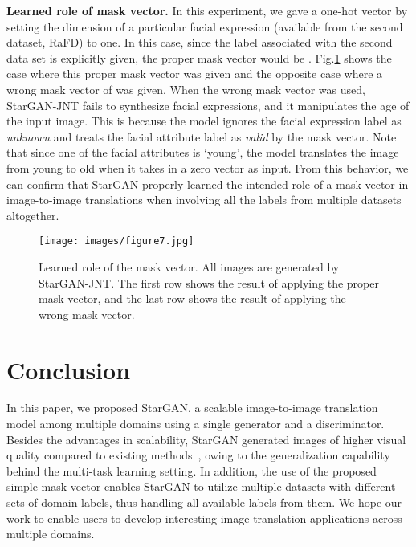 \documentclass[10pt,twocolumn,letterpaper]{article}
\begin{document}
\smallskip

\noindent\textbf{Learned role of mask vector.} In this experiment, we gave a one-hot vector  by setting the dimension of a particular facial expression (available from the second dataset, RaFD) to one. In this case, since the label associated with the second data set is explicitly given, the proper mask vector would be . Fig.\thinspace\ref{figure7} shows the case where this proper mask vector was given and the opposite case where a wrong mask vector of  was given. 
When the wrong mask vector was used, StarGAN-JNT fails to synthesize facial expressions, and it manipulates the age of the input image. This is because the model ignores the facial expression label as \textit{unknown} and treats the facial attribute label as \textit{valid} by the mask vector. Note that since one of the facial attributes is `young', the model translates the image from young to old when it takes in a zero vector as input. From this behavior, we can confirm that StarGAN properly learned the intended role of a mask vector in image-to-image translations when involving all the labels from multiple datasets altogether.

\begin{figure}[t]
\centering
\centerline{\texttt{[image: images/figure7.jpg]}}
\caption{Learned role of the mask vector. All images are generated by StarGAN-JNT. The first row shows the result of applying the proper mask vector, and the last row shows the result of applying the wrong mask vector.}
\label{figure7}
\vspace{-0.1in}
\end{figure}



\section{Conclusion} \label{conclusion}

In this paper, we proposed StarGAN, a scalable image-to-image translation model among multiple domains using a single generator and a discriminator. Besides the advantages in scalability, StarGAN generated images of higher visual quality compared to existing methods~\cite{li2016deep,perarnau2016invertible,zhu2017unpaired}, owing to the generalization capability behind the multi-task learning setting. In addition, the use of the proposed simple mask vector enables StarGAN to utilize multiple datasets with different sets of domain labels, thus handling all available labels from them. We hope our work to enable users to develop interesting image translation applications across multiple domains. 
\end{document}
